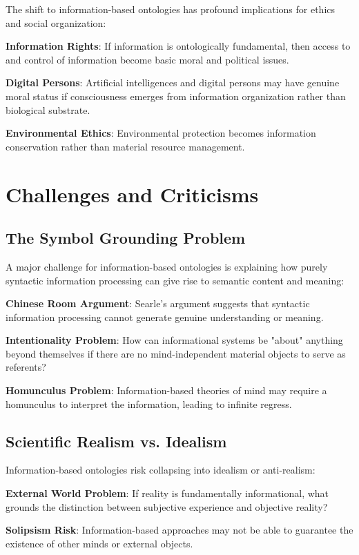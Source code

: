 \documentclass[12pt]{article}
\begin{document}
The shift to information-based ontologies has profound implications for ethics and social organization:

\textbf{Information Rights}: If information is ontologically fundamental, then access to and control of information become basic moral and political issues.

\textbf{Digital Persons}: Artificial intelligences and digital persons may have genuine moral status if consciousness emerges from information organization rather than biological substrate.

\textbf{Environmental Ethics}: Environmental protection becomes information conservation rather than material resource management.

\section{Challenges and Criticisms}

\subsection{The Symbol Grounding Problem}

A major challenge for information-based ontologies is explaining how purely syntactic information processing can give rise to semantic content and meaning:

\textbf{Chinese Room Argument}: Searle's argument suggests that syntactic information processing cannot generate genuine understanding or meaning.

\textbf{Intentionality Problem}: How can informational systems be "about" anything beyond themselves if there are no mind-independent material objects to serve as referents?

\textbf{Homunculus Problem}: Information-based theories of mind may require a homunculus to interpret the information, leading to infinite regress.

\subsection{Scientific Realism vs. Idealism}

Information-based ontologies risk collapsing into idealism or anti-realism:

\textbf{External World Problem}: If reality is fundamentally informational, what grounds the distinction between subjective experience and objective reality?

\textbf{Solipsism Risk}: Information-based approaches may not be able to guarantee the existence of other minds or external objects.
\end{document}
